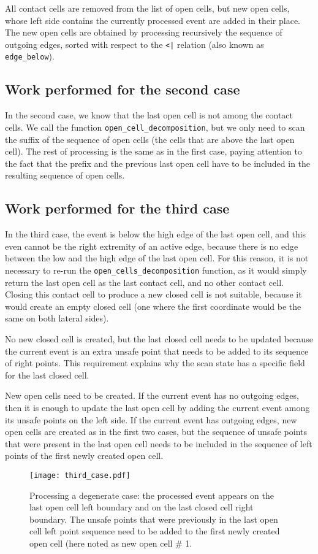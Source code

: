 \documentclass[a4paper, USenglish, cleveref, autoref, thm-restate]{lipics-v2021}
\begin{document}
All contact cells are removed from the list of open cells, but new
open cells, whose left side contains the currently processed event are
added in their place.  The new open cells are obtained by processing
recursively the sequence of outgoing edges, sorted with respect to the 
{\tt <|} relation (also known as {\tt edge\_below}).

\subsection{Work performed for the second case}
In the second case, we know that the last open cell is not among the
contact cells.  We call the function {\tt open\_cell\_decomposition},
but we only need to scan the suffix of the sequence of open cells (the
cells that are above the last open cell).  The rest of processing is
the same as in the first case, paying attention to the fact that the
prefix and the previous last open cell have to be included in the
resulting sequence of open cells.

\subsection{Work performed for the third case}
In the third case, the event is below the high edge of the last open
cell, and this even cannot be the right extremity of
an active edge, because there is no edge between the low and the high
edge of the last open cell.  For this reason, it is not necessary to
re-run the {\tt open\_cells\_decomposition} function, as it would
simply return the last open cell as the last contact cell, and no
other contact cell.  Closing this contact cell to produce a new closed
cell is not suitable, because it would create an empty closed cell
(one where the first coordinate would be the same on both lateral
sides).

No new closed cell is created, but the last closed cell needs to be
updated because the current event is an extra unsafe point that needs
to be added to its sequence of right points.  This requirement
explains why the scan state has a specific field for the last closed cell.

New open cells need to be created.  If the current event has no
outgoing edges, then it is enough to update the last open cell by adding
the current event among its unsafe points on the left side.  If the
current event has outgoing edges, new open cells are created as in the
first two cases, but the sequence of unsafe points that were present
in the last open cell needs to be included in the sequence of left
points of the first newly created open cell.
\begin{figure}
\begin{center}
\texttt{[image: third\_case.pdf]}
\end{center}
\caption{Processing a degenerate case: the processed event appears on
  the last open cell left boundary and on the last closed cell right
  boundary.  The unsafe points that were previously in the last open
  cell left point sequence need to be added to the first newly created
  open cell (here noted as {\sf new open cell \# 1}.
  }
\end{figure}
\end{document}
